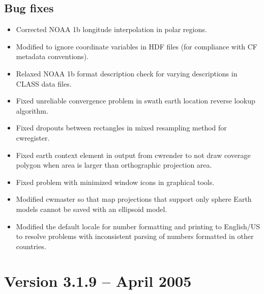 \subsection*{Bug fixes}
\begin{itemize}

  \item Corrected NOAA 1b longitude interpolation in polar regions.

  \item Modified to ignore coordinate variables in HDF files (for
  compliance with CF metadata conventions).

  \item Relaxed NOAA 1b format description check for varying
  descriptions in CLASS data files.

  \item Fixed unreliable convergence problem in swath earth location
  reverse lookup algorithm.

  \item Fixed dropouts between rectangles in mixed resampling method
  for cwregister.

  \item Fixed earth context element in output from cwrender to not
  draw coverage polygon when area is larger than orthographic
  projection area.

  \item Fixed problem with minimized window icons in graphical tools.

  \item Modified cwmaster so that map projections that support only
  sphere Earth models cannot be saved with an ellipsoid model.

  \item Modified the default locale for number formatting and printing
  to English/US to resolve problems with inconsistent parsing of
  numbers formatted in other countries.

\end{itemize}


\section{Version 3.1.9 -- April 2005}

